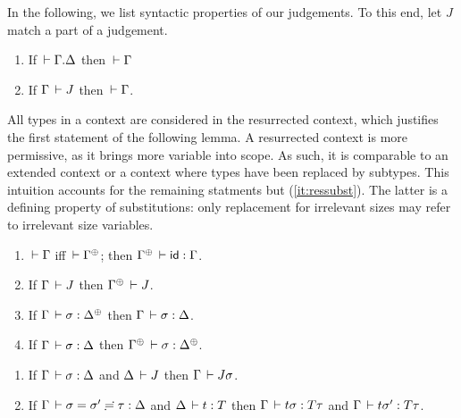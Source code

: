 \documentclass[acmlarge,review,anonymous]{acmart}\settopmatter{printfolios=true}
\begin{document}

In the following, we list syntactic properties of our judgements.  To
this end, let $J$ %
match a part of a judgement.

\begin{lemma}
\label{lem:cxtwf}\bla
  \begin{enumerate}
  \item If\/ $\,\vdash \Gamma. \Delta$ then $\,\vdash \Gamma$
  \item If\/ $\Gamma \,\vdash J$ then $\,\vdash \Gamma$.
  \end{enumerate}
\end{lemma}

All types in a context are considered in the resurrected context,
which justifies the first statement of the following lemma.
A resurrected context is more permissive, as it brings more variable
into scope.  As such, it is comparable to an extended context or a
context where types have been replaced by subtypes.  This intuition
accounts for the remaining statments but (\ref{it:ressubst}).  The
latter is a defining property of substitutions: only replacement for
irrelevant sizes may refer to irrelevant size variables.
\begin{lemma}[Resurrection]
\label{lem:res} \bla
\begin{enumerate}
\item \label{it:reswf} $\,\vdash \Gamma$ iff $\der \resurrect\Gamma$;  then $\resurrect \Gamma \der \sid : \Gamma$.
\item If\/ $\Gamma \,\vdash J$ then $\resurrect \Gamma \der J$.
\item If\/ $\Gamma \der \sigma : \resurrect \Delta$ %
  then $\Gamma \,\vdash \sigma : \Delta$.
\item \label{it:ressubst} If\/ $\Gamma \,\vdash \sigma : \Delta$ %
  then $\resurrect\Gamma \der \sigma : \resurrect\Delta$.
\end{enumerate}
\end{lemma}

\begin{lemma}[Substitution]
\label{lem:sub}\bla
\begin{enumerate}
\item
  If\/ $\Gamma \,\vdash \sigma : \Delta$ and $\Delta \,\vdash J$ then $\Gamma \,\vdash J\sigma$.
\item
  If\/ $\Gamma \,\vdash \sigma = \sigma' \risingdotseq \tau : \Delta$ and $\Delta \,\vdash t : T$ then
  $\Gamma \,\vdash t\sigma : T\tau$ and $\Gamma \,\vdash t\sigma' : T\tau$.
\end{enumerate}
\end{lemma}
\end{document}
